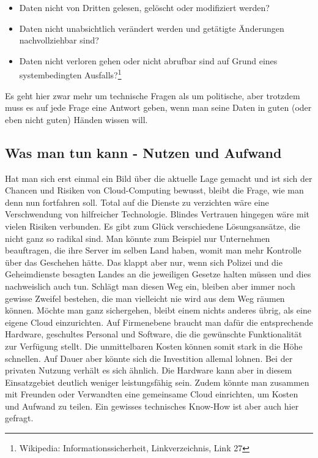\begin{itemize}
\item Daten nicht von Dritten gelesen, gelöscht oder modifiziert werden?
\item Daten nicht unabsichtlich verändert werden und getätigte Änderungen nachvollziehbar sind?
\item Daten nicht verloren gehen oder nicht abrufbar sind auf Grund eines systembedingten Ausfalls?\footnote{Wikipedia: Informationssicherheit, Linkverzeichnis, Link 27}
\end{itemize}

Es geht hier zwar mehr um technische Fragen als um politische, aber trotzdem muss es auf jede Frage eine Antwort geben, wenn man seine Daten in guten (oder eben nicht guten) Händen wissen will.

\subsection{Was man tun kann - Nutzen und Aufwand}
Hat man sich erst einmal ein Bild über die aktuelle Lage gemacht und ist sich der Chancen und Risiken von Cloud-Computing bewusst, bleibt die Frage, wie man denn nun fortfahren soll. Total auf die Dienste zu verzichten wäre eine Verschwendung von hilfreicher Technologie. Blindes Vertrauen hingegen wäre mit vielen Risiken verbunden. Es gibt zum Glück verschiedene Lösungsansätze, die nicht ganz so radikal sind. Man könnte zum Beispiel nur Unternehmen beauftragen, die ihre Server im selben Land haben, womit man mehr Kontrolle über das Geschehen hätte. Das klappt aber nur, wenn sich Polizei und die Geheimdienste besagten Landes an die jeweiligen Gesetze halten müssen und dies nachweislich auch tun. Schlägt man diesen Weg ein, bleiben aber immer noch gewisse Zweifel bestehen, die man vielleicht nie wird aus dem Weg räumen können. Möchte man ganz sichergehen, bleibt einem nichts anderes übrig, als eine eigene Cloud einzurichten. Auf Firmenebene braucht man dafür die entsprechende Hardware, geschultes Personal und  Software, die die gewünschte Funktionalität zur Verfügung stellt. Die unmittelbaren Kosten können somit stark in die Höhe schnellen. Auf Dauer aber könnte sich die Investition allemal lohnen. Bei der privaten Nutzung verhält es sich ähnlich. Die Hardware kann aber in diesem Einsatzgebiet deutlich weniger leistungsfähig sein. Zudem könnte man zusammen mit Freunden oder Verwandten eine gemeinsame Cloud einrichten, um Kosten und Aufwand zu teilen. Ein gewisses technisches Know-How ist aber auch hier gefragt.

